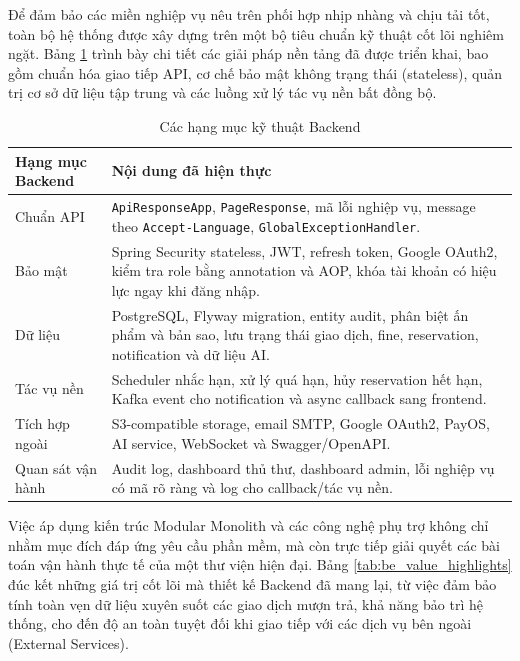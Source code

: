 Để đảm bảo các miền nghiệp vụ nêu trên phối hợp nhịp nhàng và chịu tải tốt, toàn bộ hệ thống được xây dựng trên một bộ tiêu chuẩn kỹ thuật cốt lõi nghiêm ngặt. Bảng \ref{tab:be_technical_summary} trình bày chi tiết các giải pháp nền tảng đã được triển khai, bao gồm chuẩn hóa giao tiếp API, cơ chế bảo mật không trạng thái (stateless), quản trị cơ sở dữ liệu tập trung và các luồng xử lý tác vụ nền bất đồng bộ.

\begin{table}[H]
\centering
\small
\begin{tabularx}{\textwidth}{|p{3.6cm}|X|}
\hline
\textbf{Hạng mục Backend} & \textbf{Nội dung đã hiện thực} \\
\hline
Chuẩn API &
\texttt{ApiResponseApp}, \texttt{PageResponse}, mã lỗi nghiệp vụ, message theo
\texttt{Accept-Language}, \texttt{GlobalExceptionHandler}. \\
\hline
Bảo mật &
Spring Security stateless, JWT, refresh token, Google OAuth2, kiểm tra role bằng
annotation và AOP, khóa tài khoản có hiệu lực ngay khi đăng nhập. \\
\hline
Dữ liệu &
PostgreSQL, Flyway migration, entity audit, phân biệt ấn phẩm và bản sao, lưu
trạng thái giao dịch, fine, reservation, notification và dữ liệu AI. \\
\hline
Tác vụ nền &
Scheduler nhắc hạn, xử lý quá hạn, hủy reservation hết hạn, Kafka event cho
notification và async callback sang frontend. \\
\hline
Tích hợp ngoài &
S3-compatible storage, email SMTP, Google OAuth2, PayOS, AI service, WebSocket
và Swagger/OpenAPI. \\
\hline
Quan sát vận hành &
Audit log, dashboard thủ thư, dashboard admin, lỗi nghiệp vụ có mã rõ ràng và
log cho callback/tác vụ nền. \\
\hline
\end{tabularx}
\caption{Các hạng mục kỹ thuật Backend}
\label{tab:be_technical_summary}
\end{table}

Việc áp dụng kiến trúc Modular Monolith và các công nghệ phụ trợ không chỉ nhằm mục đích đáp ứng yêu cầu phần mềm, mà còn trực tiếp giải quyết các bài toán vận hành thực tế của một thư viện hiện đại. Bảng \ref{tab:be_value_highlights} đúc kết những giá trị cốt lõi mà thiết kế Backend đã mang lại, từ việc đảm bảo tính toàn vẹn dữ liệu xuyên suốt các giao dịch mượn trả, khả năng bảo trì hệ thống, cho đến độ an toàn tuyệt đối khi giao tiếp với các dịch vụ bên ngoài (External Services).

